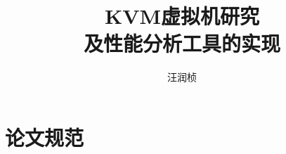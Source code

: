 \documentclass[master]{ustcthesis}
\title{KVM虚拟机研究\\及性能分析工具的实现}
\author{汪润桢}
\begin{document}
\maketitle

%
%
%

\frontmatter

\tableofcontents
\listoffigures
\listoftables
% 

\mainmatter






\appendix
\chapter{论文规范}

\backmatter


\end{document}
